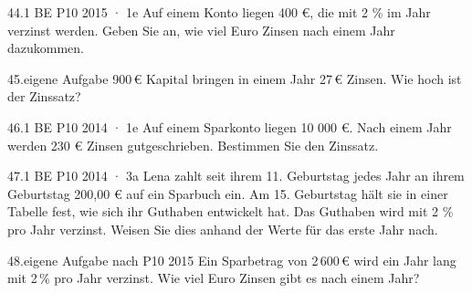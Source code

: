 \documentclass[11pt]{article}
\begin{document}
\begin{pfaufgabe}{44.}{1 BE \textperiodcentered{} P10 2015 · 1e}
Auf einem Konto liegen 400 €, die mit 2 \% im Jahr verzinst werden. Geben Sie an, wie viel Euro Zinsen nach einem Jahr dazukommen.
\end{pfaufgabe}
\begin{pfaufgabe}{45.}{eigene Aufgabe}
900\,€ Kapital bringen in einem Jahr 27\,€ Zinsen. Wie hoch ist der Zinssatz?
\end{pfaufgabe}
\begin{pfaufgabe}{46.}{1 BE \textperiodcentered{} P10 2014 · 1e}
Auf einem Sparkonto liegen 10 000 €. Nach einem Jahr werden 230 € Zinsen gutgeschrieben. Bestimmen Sie den Zinssatz.
\end{pfaufgabe}
\begin{pfaufgabe}{47.}{1 BE \textperiodcentered{} P10 2014 · 3a}
Lena zahlt seit ihrem 11. Geburtstag jedes Jahr an ihrem Geburtstag 200,00 € auf ein Sparbuch ein. Am 15. Geburtstag hält sie in einer Tabelle fest, wie sich ihr Guthaben entwickelt hat. Das Guthaben wird mit 2 \% pro Jahr verzinst. Weisen Sie dies anhand der Werte für das erste Jahr nach.
\par\smallskip\noindent {}\par
{}
\end{pfaufgabe}
\begin{pfaufgabe}{48.}{eigene Aufgabe nach P10 2015}
Ein Sparbetrag von 2\,600\,€ wird ein Jahr lang mit 2\,\% pro Jahr verzinst. Wie viel Euro Zinsen gibt es nach einem Jahr?
\end{pfaufgabe}
\end{document}
